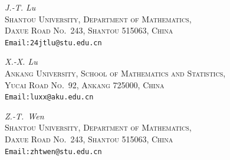 \documentclass[a4paper,12pt]{article}
\numberwithin{equation}{section}
\begin{document}
\bigskip

\noindent
\emph{J.-T. Lu}\\
\textsc{Shantou University, Department of Mathematics,\\
Daxue Road No.~243, Shantou 515063, China}\\
\texttt{Email:24jtlu@stu.edu.cn}

\bigskip
\noindent
\emph{X.-X. Lu}\\
\textsc{Ankang University, School of Mathematics and Statistics,\\
Yucai Road No.~92, Ankang 725000, China}\\
\texttt{Email:luxx@aku.edu.cn}


\bigskip
\noindent
\emph{Z.-T.~Wen}\\
\textsc{Shantou University, Department of Mathematics,\\
Daxue Road No.~243, Shantou 515063, China}\\
\texttt{Email:zhtwen@stu.edu.cn}

\vspace{1cm}
\end{document}
